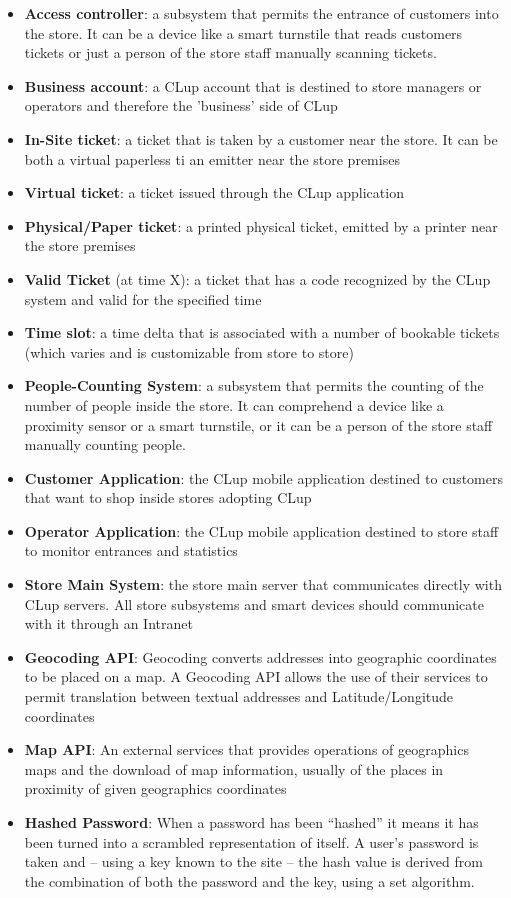 \begin{itemize}
    \item \textbf{Access controller}: a subsystem that permits the entrance of customers into the store. It can be a device like a smart turnstile that reads customers tickets or just a person of the store staff manually scanning tickets.
    \item \textbf{Business account}: a CLup account that is destined to store managers or operators and therefore the 'business' side of CLup
    \item \textbf{In-Site ticket}: a ticket that is taken by a customer near the store. It can be both a virtual paperless ti an emitter near the store premises
    \item \textbf{Virtual ticket}: a ticket issued through the CLup application
    \item \textbf{Physical/Paper ticket}: a printed physical ticket, emitted by a printer near the store premises
    \item \textbf{Valid Ticket} (at time X): a ticket that has a code recognized by the CLup system and valid for the specified time
    \item \textbf{Time slot}: a time delta that is associated with a number of bookable tickets (which varies and is customizable from store to store)
    \item \textbf{People-Counting System}: a subsystem that permits the counting of the number of people inside the store. It can comprehend a device like a proximity sensor or a smart turnstile, or it can be a person of the store staff manually counting people.
    \item \textbf{Customer Application}: the CLup mobile application destined to customers that want to shop inside stores adopting CLup
    \item \textbf{Operator Application}: the CLup mobile application destined to store staff to monitor entrances and statistics
    \item \textbf{Store Main System}: the store main server that communicates directly with CLup servers. All store subsystems and smart devices should communicate with it through an Intranet
    \item \textbf{Geocoding API}: Geocoding converts addresses into geographic coordinates to be placed on a map. A Geocoding API allows the use of their services to permit translation between textual addresses and Latitude/Longitude coordinates
    \item \textbf{Map API}: An external services that provides operations of geographics maps and the download of map information, usually of the places in proximity of given geographics coordinates
    \item \textbf{Hashed Password}: When a password has been “hashed” it means it has been turned into a scrambled representation of itself. A user's password is taken and – using a key known to the site – the hash value is derived from the combination of both the password and the key, using a set algorithm.
\end{itemize}

